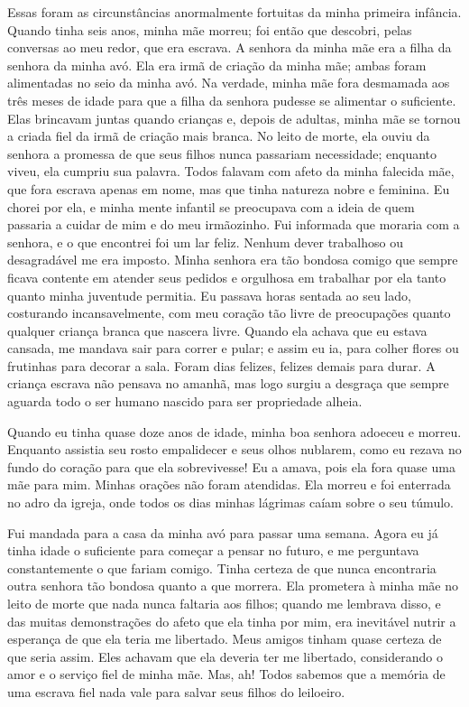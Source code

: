 Essas foram as circunstâncias
anormalmente fortuitas da minha primeira infância. Quando tinha seis
anos, minha mãe morreu; foi então que descobri, pelas conversas ao meu
redor, que era escrava. A senhora
da minha mãe era a filha da senhora da minha avó. Ela era irmã de
criação da minha mãe; ambas foram alimentadas no seio da minha avó. Na
verdade, minha mãe fora desmamada aos três meses de idade para que a
filha da senhora pudesse se alimentar o suficiente. Elas brincavam
juntas quando crianças e, depois de adultas, minha mãe se tornou a
criada fiel da irmã de criação mais branca. No leito de morte, ela ouviu
da senhora a promessa de que seus filhos nunca passariam necessidade;
enquanto viveu, ela cumpriu sua palavra. Todos falavam com afeto da
minha falecida mãe, que fora escrava apenas em nome, mas que tinha
natureza nobre e feminina. Eu chorei por ela, e minha mente infantil se
preocupava com a ideia de quem passaria a cuidar de mim e do meu
irmãozinho. Fui informada que moraria com a senhora, e o que encontrei
foi um lar feliz. Nenhum dever trabalhoso ou desagradável me era
imposto. Minha senhora era tão bondosa comigo que sempre ficava contente
em atender seus pedidos e orgulhosa em trabalhar por ela tanto quanto
minha juventude permitia. Eu passava horas sentada ao seu lado,
costurando incansavelmente, com meu coração tão livre de preocupações
quanto qualquer criança branca que nascera livre. Quando ela achava que
eu estava cansada, me mandava sair para correr e pular; e assim eu ia,
para colher flores ou frutinhas para decorar a sala.
Foram dias felizes, felizes demais
para durar. A criança escrava não pensava no amanhã, mas logo surgiu a
desgraça que sempre aguarda todo o ser humano nascido para ser
propriedade alheia.

Quando eu tinha quase doze anos de
idade, minha boa senhora adoeceu e morreu. Enquanto assistia seu rosto
empalidecer e seus olhos nublarem, como eu rezava no fundo do coração
para que ela sobrevivesse! Eu a amava, pois ela fora quase uma mãe para
mim. Minhas orações não foram atendidas. Ela morreu e foi enterrada no
adro da igreja, onde todos os dias minhas lágrimas caíam sobre o seu
túmulo.

Fui mandada para a casa da minha avó
para passar uma semana. Agora eu já tinha idade o suficiente para
começar a pensar no futuro, e me perguntava constantemente o que fariam
comigo. Tinha certeza de que nunca encontraria outra senhora tão bondosa
quanto a que morrera. Ela prometera à minha mãe no leito de morte que
nada nunca faltaria aos filhos; quando me lembrava disso, e das muitas
demonstrações do afeto que ela tinha por mim, era inevitável nutrir a
esperança de que ela teria me libertado. Meus amigos tinham quase
certeza de que seria assim. Eles achavam que ela deveria ter me
libertado, considerando o amor e o serviço fiel de minha mãe. Mas, ah!
Todos sabemos que a memória de uma escrava fiel nada vale para salvar
seus filhos do leiloeiro.

